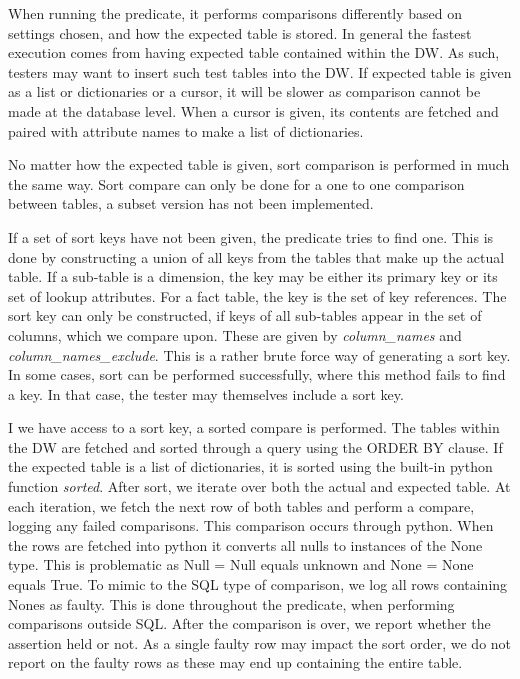 When running the predicate, it performs comparisons differently based on settings chosen, and how the expected table is stored. In general the fastest execution comes from having expected table contained within the DW. As such, testers may want to insert such test tables into the DW. If expected table is given as a list or dictionaries or a cursor, it will be slower as comparison cannot be made at the database level.  When a cursor is given, its contents are fetched and paired with attribute names to make a list of dictionaries. 

No matter how the expected table is given, sort comparison is performed in much the same way. Sort compare can only be done for a one to one comparison between tables, a subset version has not been implemented.

If a set of sort keys have not been given, the predicate tries to find one. This is done by constructing a union of all keys from the tables that make up the actual table. If a sub-table is a dimension, the key may be either its primary key or its set of lookup attributes. For a fact table, the key is the set of key references. The sort key can only be constructed, if keys of all sub-tables appear in the set of columns, which we compare upon. These are given by \textit{column\_names} and \textit{column\_names\_exclude}. This is a rather brute force way of generating a sort key. In some cases, sort can be performed successfully, where this method fails to find a key. In that case, the tester may themselves include a sort key. 

I we have access to a sort key, a sorted compare is performed. The tables within the DW are fetched and sorted through a query using the ORDER BY clause. If the expected table is a list of dictionaries, it is sorted using the built-in python function \textit{sorted}. After sort, we iterate over both the actual and expected table. At each iteration, we fetch the next row of both tables and perform a compare, logging any failed comparisons. This comparison occurs through python. When the rows are fetched into python it  converts all nulls to instances of the None type. This is problematic as Null = Null equals unknown and None = None equals True. To mimic to the SQL type of comparison, we log all rows containing Nones as faulty. This is done throughout the predicate, when performing comparisons outside SQL. After the comparison is over, we report whether the assertion held or not. As a single faulty row may impact the sort order, we do not report on the faulty rows as these may end up containing the entire table. 

